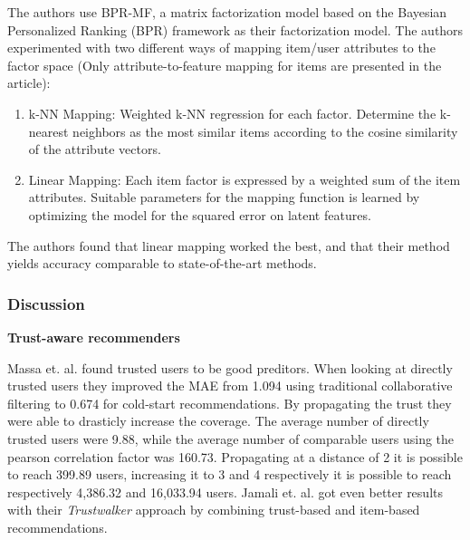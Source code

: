 The authors use BPR-MF, a matrix factorization model based on the Bayesian Personalized Ranking (BPR) framework as their factorization model. The authors experimented with two different ways of mapping item/user attributes to the factor space (Only attribute-to-feature mapping for items are presented in the article):

\begin{enumerate}
\item k-NN Mapping:	Weighted k-NN regression for each factor. Determine the k-nearest neighbors as the most similar items according to the cosine similarity of the attribute vectors.
\item Linear Mapping: Each item factor is expressed by a weighted sum of the item attributes. Suitable parameters for the mapping function is learned by optimizing the model for the squared error on latent features.
\end{enumerate}

The authors found that linear mapping worked the best, and that their method yields accuracy comparable to state-of-the-art methods.

\subsubsection{Discussion}


\textbf{Trust-aware recommenders}

Massa et. al. \cite{Massa2007} found trusted users to be good preditors. When looking at directly trusted users they improved the MAE from 1.094 using traditional collaborative filtering to 0.674 for cold-start recommendations. By propagating the trust they were able to drasticly increase the coverage. The average number of directly trusted users were 9.88, while the average number of comparable users using the pearson correlation factor was 160.73. Propagating at a distance of 2 it is possible to reach 399.89 users, increasing it to 3 and 4 respectively it is possible to reach respectively 4,386.32 and 16,033.94 users. Jamali et. al. \cite{Jamali2009} got even better results with their \emph{Trustwalker} approach by combining trust-based and item-based recommendations. 

